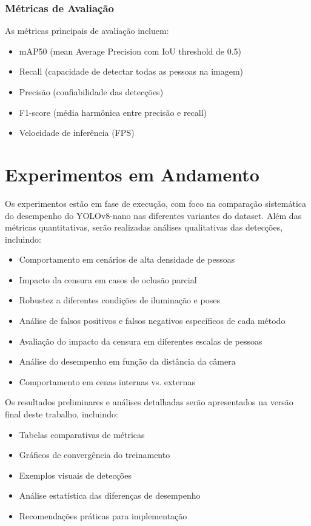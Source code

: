 \documentclass[12pt,a4paper]{article}
\begin{document}
\subsubsection{Métricas de Avaliação}
As métricas principais de avaliação incluem:
\begin{itemize}
    \item mAP50 (mean Average Precision com IoU threshold de 0.5)
    \item Recall (capacidade de detectar todas as pessoas na imagem)
    \item Precisão (confiabilidade das detecções)
    \item F1-score (média harmônica entre precisão e recall)
    \item Velocidade de inferência (FPS)
\end{itemize}

\section{Experimentos em Andamento}
Os experimentos estão em fase de execução, com foco na comparação sistemática do desempenho do YOLOv8-nano nas diferentes variantes do dataset. Além das métricas quantitativas, serão realizadas análises qualitativas das detecções, incluindo:

\begin{itemize}
    \item Comportamento em cenários de alta densidade de pessoas
    \item Impacto da censura em casos de oclusão parcial
    \item Robustez a diferentes condições de iluminação e poses
    \item Análise de falsos positivos e falsos negativos específicos de cada método
    \item Avaliação do impacto da censura em diferentes escalas de pessoas
    \item Análise do desempenho em função da distância da câmera
    \item Comportamento em cenas internas vs. externas
\end{itemize}

Os resultados preliminares e análises detalhadas serão apresentados na versão final deste trabalho, incluindo:

\begin{itemize}
    \item Tabelas comparativas de métricas
    \item Gráficos de convergência do treinamento
    \item Exemplos visuais de detecções
    \item Análise estatística das diferenças de desempenho
    \item Recomendações práticas para implementação
\end{itemize}
\end{document}
